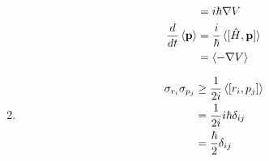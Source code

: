 \documentclass{article}
\renewcommand{\vec}[1]{\boldsymbol{\mathbf{#1}}}
\begin{document}
\begin{enumerate}
\begin{align*}
          [\hat{H}, \vec{p}]             & = i \hbar \nabla V                                                                                                                                                                                                                                                             \\
          \frac{d}{d t} \braket{\vec{p}} & = \frac{i}{\hbar} \braket{[\hat{H}, \vec{p}]}                                                                                                                                                                                                                                  \\
                                         & = \braket{-\nabla V}
        \end{align*}

  \item

        \begin{align*}
          \sigma_{r_i} \sigma_{p_j} & \ge \frac{1}{2 i} \braket{[r_i, p_j]} \\
                                    & = \frac{1}{2 i} i \hbar \delta_{i j}  \\
                                    & = \frac{\hbar}{2} \delta_{i j}
        \end{align*}
\end{enumerate}

\subsection{}
\end{document}
